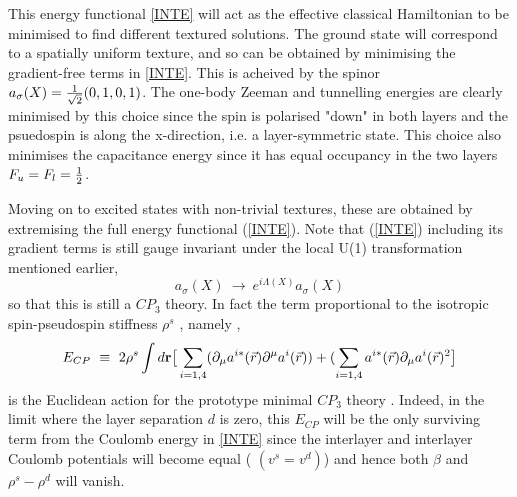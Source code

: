 This energy functional \ref{INTE} will act as the effective classical
Hamiltonian to be minimised to find different textured solutions.
The ground state will correspond to a spatially uniform texture, and
so can be obtained by minimising the gradient-free terms in \ref{INTE}.
This is acheived by the spinor $a_{\sigma}(X) =
{1 \over \sqrt{2}} (0, 1, 0, 1) $. The one-body Zeeman and tunnelling
energies are clearly minimised
by this choice since the spin is
polarised "down" in both layers and the psuedospin is along the x-direction,
i.e. a layer-symmetric state.
This choice also minimises the capacitance energy since it has 
equal occupancy in the two layers $F_{u} = F_{l} = {1 \over 2}$. 

Moving on to excited states with non-trivial textures, 
these are obtained by extremising the full energy functional 
(\ref{INTE}). Note that (\ref{INTE}) including its gradient terms is 
still gauge invariant under the local U(1) transformation mentioned 
earlier,
\begin{equation} a_{\sigma}(X) \ \rightarrow \ e^{i \Lambda(X)}
a_{\sigma}(X) \label{GT}\end{equation} 
so that this is still a $CP_3$ theory.
In fact the term proportional to the isotropic spin-pseudospin stiffness
$\rho^{s}$
, namely ,
\begin{equation} E_{CP} \ \equiv \ 2\rho^{s} \int d{\bf r} \big{[}
\sum_{i=1,4}(\partial_{\mu}a^{i\ast}(\vec{r})\partial^{\mu}a^{i}(\vec{r}))
+(\sum_{i=1,4}a^{i \ast}(\vec{r})\partial_{\mu}a^{i}(\vec{r})^{2}
\big{]} \label{proto} \end{equation}
is the Euclidean action for the prototype minimal $CP_3$ theory
\cite{CP}. Indeed, in the limit where the layer separation $d$ is zero, 
this $E_{CP}$ will
be the only surviving term from the Coulomb energy in \ref{INTE} since
the interlayer and interlayer Coulomb potentials
will become equal ( $(v^{s} = v^{d})$) and
hence both $\beta$ and $\rho^{s}- \rho^{d}$ will vanish.

